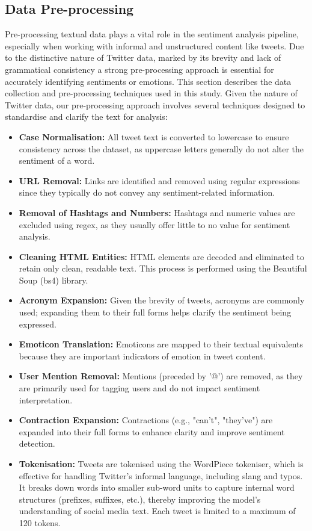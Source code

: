 \documentclass{article}
\begin{document}
\subsection{Data Pre-processing}
Pre-processing textual data plays a vital role in the sentiment analysis pipeline, especially when working with informal and unstructured content like tweets. Due to the distinctive nature of Twitter data, marked by its brevity and lack of grammatical consistency a strong pre-processing approach is essential for accurately identifying sentiments or emotions. This section describes the data collection and pre-processing techniques used in this study. Given the nature of Twitter data, our pre-processing approach involves several techniques designed to standardise and clarify the text for analysis:

\begin{itemize}
\item \textbf{Case Normalisation:} All tweet text is converted to lowercase to ensure consistency across the dataset, as uppercase letters generally do not alter the sentiment of a word.
\item  \textbf{URL Removal:} Links are identified and removed using regular expressions since they typically do not convey any sentiment-related information.
\item  \textbf{Removal of Hashtags and Numbers:} Hashtags and numeric values are excluded using regex, as they usually offer little to no value for sentiment analysis.
\item  \textbf{Cleaning HTML Entities:} HTML elements are decoded and eliminated to retain only clean, readable text. This process is performed using the Beautiful Soup (bs4) library.
\item \textbf{Acronym Expansion:} Given the brevity of tweets, acronyms are commonly used; expanding them to their full forms helps clarify the sentiment being expressed.
\item  \textbf{Emoticon Translation:} Emoticons are mapped to their textual equivalents because they are important indicators of emotion in tweet content.
\item  \textbf{User Mention Removal:} Mentions (preceded by '@') are removed, as they are primarily used for tagging users and do not impact sentiment interpretation.
\item  \textbf{Contraction Expansion:} Contractions (e.g., "can’t", "they’ve") are expanded into their full forms to enhance clarity and improve sentiment detection.
\item  \textbf{Tokenisation:} Tweets are tokenised using the WordPiece tokeniser, which is effective for handling Twitter's informal language, including slang and typos. It breaks down words into smaller sub-word units to capture internal word structures (prefixes, suffixes, etc.), thereby improving the model's understanding of social media text. Each tweet is limited to a maximum of 120 tokens.
\end{itemize}
\end{document}
